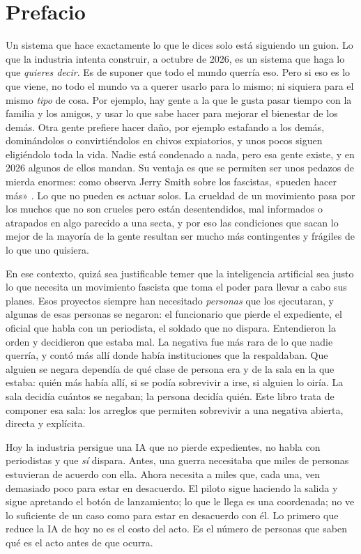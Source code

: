 \chapter*{Prefacio}
Un sistema que hace exactamente lo que le dices solo está siguiendo un guion. Lo que la industria intenta construir, a octubre de 2026, es un sistema que haga lo que \emph{quieres decir}. Es de suponer que todo el mundo querría eso. Pero si eso es lo que viene, no todo el mundo va a querer usarlo para lo mismo; ni siquiera para el mismo \emph{tipo} de cosa. Por ejemplo, hay gente a la que le gusta pasar tiempo con la familia y los amigos, y usar lo que sabe hacer para mejorar el bienestar de los demás. Otra gente prefiere hacer daño, por ejemplo estafando a los demás, dominándolos o convirtiéndolos en chivos expiatorios, y unos pocos siguen eligiéndolo toda la vida. Nadie está condenado a nada, pero esa gente existe, y en 2026 algunos de ellos mandan. Su ventaja es que se permiten ser unos pedazos de mierda enormes: como observa Jerry Smith sobre los fascistas, «pueden hacer más» \autocite{rickandmorty2023}. Lo que no pueden es actuar solos. La crueldad de un movimiento pasa por los muchos que no son crueles pero están desentendidos, mal informados o atrapados en algo parecido a una secta, y por eso las condiciones que sacan lo mejor de la mayoría de la gente resultan ser mucho más contingentes y frágiles de lo que uno quisiera.

En ese contexto, quizá sea justificable temer que la inteligencia artificial sea justo lo que necesita un movimiento fascista que toma el poder para llevar a cabo sus planes. Esos proyectos siempre han necesitado \emph{personas} que los ejecutaran, y algunas de esas personas se negaron: el funcionario que pierde el expediente, el oficial que habla con un periodista, el soldado que no dispara. Entendieron la orden y decidieron que estaba mal. La negativa fue más rara de lo que nadie querría, y contó más allí donde había instituciones que la respaldaban. Que alguien se negara dependía de qué clase de persona era y de la sala en la que estaba: quién más había allí, si se podía sobrevivir a irse, si alguien lo oiría. La sala decidía cuántos se negaban; la persona decidía quién. Este libro trata de componer esa sala: los arreglos que permiten sobrevivir a una negativa abierta, directa y explícita.

Hoy la industria persigue una IA que no pierde expedientes, no habla con periodistas y que \emph{sí} dispara. Antes, una guerra necesitaba que miles de personas estuvieran de acuerdo con ella. Ahora necesita a miles que, cada una, ven demasiado poco para estar en desacuerdo. El piloto sigue haciendo la salida y sigue apretando el botón de lanzamiento; lo que le llega es una coordenada; no ve lo suficiente de un caso como para estar en desacuerdo con él. Lo primero que reduce la IA de hoy no es el costo del acto. Es el número de personas que saben qué es el acto antes de que ocurra.

